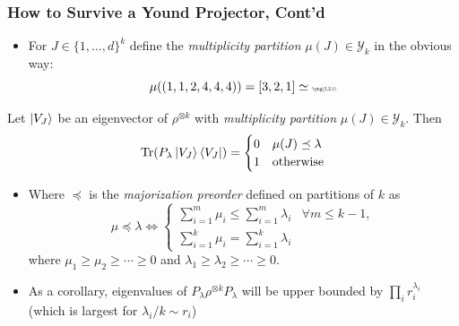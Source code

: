 \documentclass[
    9pt,
    hyperref={bookmarks=false, colorlinks=false}, %
    xcolor={dvipsnames},
]{beamer}
\DeclareMathOperator{\Tr}{Tr}
\begin{document}
\begin{frame}
    \frametitle{How to Survive a Yound Projector, Cont'd}
    \begin{itemize}
        \item For $J \in \{1, \ldots, d\}^{k}$ define the \textit{multiplicity partition} $\mu(J) \in \mathcal Y_k$ in the obvious way:
            \[ \mu((1,1,2,4,4,4)) = [3, 2, 1] \simeq \scalebox{0.4}{\yng(3,2,1)} \]
    \end{itemize}
    \begin{theorem}
        Let $\ket{V_J}$ be an eigenvector of $\rho^{\otimes k}$ with \textit{multiplicity partition} $\mu(J) \in \mathcal Y_k$. Then
        \[ \Tr(P_\lambda \ket{V_J}\bra{V_J}) = \begin{cases} 0 & \mu(J) \preceq \lambda \\ 1 & \text{otherwise} \end{cases} \]
    \end{theorem}
    \begin{itemize}
        \item Where $\preceq$ is the \textit{majorization preorder} defined on partitions of $k$ as
            \[ \mu \preceq \lambda \iff \begin{cases} \sum_{i=1}^{m} \mu_{i} \leq \sum_{i=1}^{m} \lambda_{i} & \forall m \leq k-1, \\ \sum_{i=1}^{k} \mu_{i} = \sum_{i=1}^{k} \lambda_{i} \end{cases} \]
        where $\mu_1 \geq \mu_2 \geq \cdots \geq 0$ and $\lambda_1 \geq \lambda_2 \geq \cdots \geq 0$.
        \item As a corollary, eigenvalues of $P_\lambda \rho^{\otimes k} P_{\lambda}$ will be upper bounded by $\prod_{i} r_i^{\lambda_i}$ (which is largest for $\lambda_i/k \sim r_i$)
    \end{itemize}
\end{frame}
\end{document}
